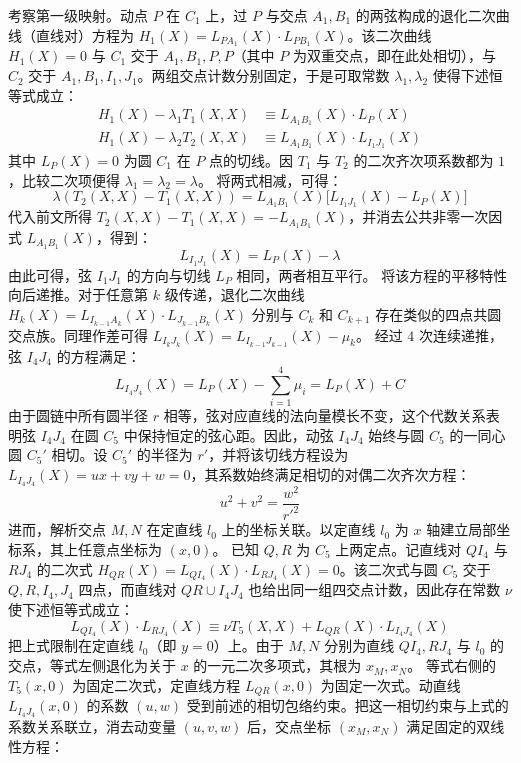 \begin{solution}
考察第一级映射。动点 $P$ 在 $C_1$ 上，过 $P$ 与交点 $A_1, B_1$ 的两弦构成的退化二次曲线（直线对）方程为 $H_1(X) = L_{P A_1}(X) \cdot L_{P B_1}(X)$。该二次曲线 $H_1(X)=0$ 与 $C_1$ 交于 $A_1, B_1, P, P$（其中 $P$ 为双重交点，即在此处相切），与 $C_2$ 交于 $A_1, B_1, I_1, J_1$。两组交点计数分别固定，于是可取常数 $\lambda_1, \lambda_2$ 使得下述恒等式成立：
\begin{align*}
H_1(X) - \lambda_1 T_1(X,X) &\equiv L_{A_1 B_1}(X) \cdot L_P(X) \\
H_1(X) - \lambda_2 T_2(X,X) &\equiv L_{A_1 B_1}(X) \cdot L_{I_1 J_1}(X)
\end{align*}
其中 $L_P(X)=0$ 为圆 $C_1$ 在 $P$ 点的切线。因 $T_1$ 与 $T_2$ 的二次齐次项系数都为 $1$，比较二次项便得 $\lambda_1 = \lambda_2 = \lambda$。
将两式相减，可得：
$$ \lambda (T_2(X,X) - T_1(X,X)) = L_{A_1 B_1}(X) \big[ L_{I_1 J_1}(X) - L_P(X) \big] $$
代入前文所得 $T_2(X,X) - T_1(X,X) = -L_{A_1 B_1}(X)$，并消去公共非零一次因式 $L_{A_1 B_1}(X)$，得到：
$$ L_{I_1 J_1}(X) = L_P(X) - \lambda $$
由此可得，弦 $I_1 J_1$ 的方向与切线 $L_P$ 相同，两者相互平行。
将该方程的平移特性向后递推。对于任意第 $k$ 级传递，退化二次曲线 $H_k(X) = L_{I_{k-1} A_k}(X) \cdot L_{J_{k-1} B_k}(X)$ 分别与 $C_k$ 和 $C_{k+1}$ 存在类似的四点共圆交点族。同理作差可得 $L_{I_k J_k}(X) = L_{I_{k-1} J_{k-1}}(X) - \mu_k$。
经过 $4$ 次连续递推，弦 $I_4 J_4$ 的方程满足：
$$ L_{I_4 J_4}(X) = L_P(X) - \sum_{i=1}^4 \mu_i = L_P(X) + C $$
由于圆链中所有圆半径 $r$ 相等，弦对应直线的法向量模长不变，这个代数关系表明弦 $I_4 J_4$ 在圆 $C_5$ 中保持恒定的弦心距。因此，动弦 $I_4 J_4$ 始终与圆 $C_5$ 的一同心圆 $C_5'$ 相切。设 $C_5'$ 的半径为 $r'$，并将该切线方程设为 $L_{I_4 J_4}(X) = u x + v y + w = 0$，其系数始终满足相切的对偶二次齐次方程：
$$ u^2 + v^2 = \frac{w^2}{r'^2} $$
进而，解析交点 $M, N$ 在定直线 $l_0$ 上的坐标关联。以定直线 $l_0$ 为 $x$ 轴建立局部坐标系，其上任意点坐标为 $(x, 0)$。
已知 $Q, R$ 为 $C_5$ 上两定点。记直线对 $QI_4$ 与 $RJ_4$ 的二次式 $H_{QR}(X) = L_{Q I_4}(X) \cdot L_{R J_4}(X) = 0$。该二次式与圆 $C_5$ 交于 $Q, R, I_4, J_4$ 四点，而直线对 $QR\cup I_4J_4$ 也给出同一组四交点计数，因此存在常数 $\nu$ 使下述恒等式成立：
$$ L_{Q I_4}(X) \cdot L_{R J_4}(X) \equiv \nu T_5(X,X) + L_{QR}(X) \cdot L_{I_4 J_4}(X) $$
把上式限制在定直线 $l_0$（即 $y=0$）上。由于 $M, N$ 分别为直线 $QI_4, RJ_4$ 与 $l_0$ 的交点，等式左侧退化为关于 $x$ 的一元二次多项式，其根为 $x_M, x_N$。
等式右侧的 $T_5(x,0)$ 为固定二次式，定直线方程 $L_{QR}(x,0)$ 为固定一次式。动直线 $L_{I_4 J_4}(x,0)$ 的系数 $(u, w)$ 受到前述的相切包络约束。把这一相切约束与上式的系数关系联立，消去动变量 $(u, v, w)$ 后，交点坐标 $(x_M, x_N)$ 满足固定的双线性方程：

\end{solution}
